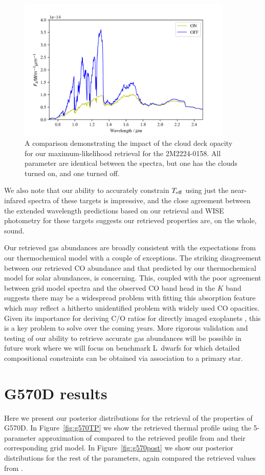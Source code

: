 \documentclass[useAMS,usenatbib]{mn2e}
\begin{document}
\begin{figure}
\hspace{-0.8cm}
\includegraphics[width=290pt]{2M2224_ONOFF.png}
\caption{A comparison demonstrating the impact of the cloud deck opacity for our maximum-likelihood retrieval for the 2M2224-0158. All parameter are identical between the spectra, but one has the clouds turned on, and one turned off. 
\label{fig:clouddemo}}
\end{figure}


We also note that our ability to accurately constrain $T_{\rm eff}$ using just the near-infared spectra of these targets is impressive, and the close agreement between the extended wavelength predictions based on our retrieval and WISE photometry for these targets suggests our retrieved properties are, on the whole, sound. 


Our retrieved gas abundances are broadly consistent with the expectations from our thermochemical model with a couple of exceptions. The striking disagreement between our retrieved CO abundance and that predicted by our thermochemical model for solar abundances, is concerning. This, coupled with the poor agreement between grid model spectra and the observed CO band head in the $K$ band suggests there may be a widespread problem with fitting this absorption feature which may reflect a hitherto unidentified problem with widely used CO opacities. Given its importance for deriving C/O ratios for directly imaged exoplanets \citep[e.g.][]{konopacky2013}, this is a key problem to solve over the coming years. More rigorous validation and testing of our ability to retrieve accurate gas abundances will be possible in future work where we will focus on benchmark L~dwarfs for which detailed compositional constraints can be obtained via association to a primary star. 


\appendix
\section{G570D results}
\label{sec:g570}
Here we present our posterior distributions for the retrieval of the properties of G570D. In Figure~\ref{fig:g570TP} we show the retrieved thermal profile using the 5-parameter approximation of \citet{madhu2009} compared to the retrieved profile from \citet{line2015} and their corresponding grid model. In Figure~\ref{fig:g570post} we show our posterior distributions for the rest of the parameters, again compared the retrieved values from \citet{line2015}.
\end{document}

